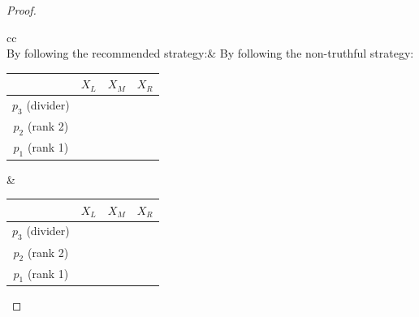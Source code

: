 \begin{proof}
		\begin{table}[htb]
		\centering
		\renewcommand{\arraystretch}{1.2}
		\begin{tabular}{cc}
		\\
		By following the recommended strategy:& By following the non-truthful strategy:\\
 		\begin{tabular}{c|ccc}
		& $X_L$& $X_M$& $X_R$\\
		\hline
		$p_3$ (divider)  &  \Checkmark &  \Checkmark &  \Checkmark \\
  $p_2$ (rank 2) &  \Checkmark & \Checkmark &  \XSolidBrush \\
  $p_1$ (rank 1)&  \Checkmark &  \Checkmark & \XSolidBrush
 		\end{tabular}&
 		\begin{tabular}{c|ccc}
		& $X_L$& $X_M$& $X_R$\\
		\hline
		$p_3$ (divider)  &  \Checkmark &  \Checkmark &  \Checkmark \\
  $p_2$ (rank 2) &  \Checkmark & \Checkmark &  \XSolidBrush \\
  $p_1$ (rank 1)&  \Checkmark & \XSolidBrush & \XSolidBrush
 		\end{tabular}
 		\end{tabular}
 		

\end{table}
\end{proof}
